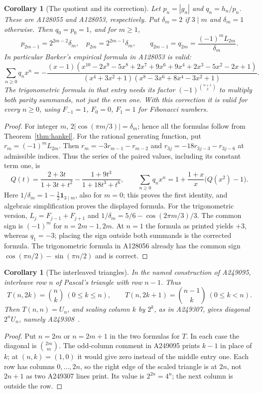 \documentclass[11pt]{article}
\newtheorem{corollary}[theorem]{Corollary}
\begin{document}
\begin{corollary}[The quotient and its correction]\label{cor:quotient}
Let $p_n=|g_n|$ and $q_n=h_n/p_n$. These are A128055 and A128053,
respectively. Put $\delta_m=2$ if $3\mid m$ and $\delta_m=1$ otherwise.
Then $q_0=p_0=1$, and for $m\geq1$,
\[
 p_{2m-1}=2^{2m-2}\delta_m,\quad p_{2m}=2^{2m-1}\delta_m,
 \qquad q_{2m-1}=q_{2m}=\frac{(-1)^mL_{2m}}{\delta_m}.
\]
In particular Barker's empirical formula in A128053 is valid:
\[
 \sum_{n\geq0}q_nx^n=
 -\frac{(x-1)(x^{10}-2x^9-5x^8+2x^7+9x^6+9x^4+2x^3-5x^2-2x+1)}
 {(x^4+3x^2+1)(x^8-3x^6+8x^4-3x^2+1)}.
\]
The trigonometric formula in that entry needs its factor
$(-1)^{\binom{n+1}2}$ to multiply both parity summands, not just the
even one. With this correction it is valid for every $n\geq0$,
using $F_{-1}=1$, $F_0=0$, $F_1=1$ for Fibonacci numbers.
\end{corollary}
\begin{proof}
For integer $m$, $2|\cos(\pi m/3)|=\delta_m$; hence all the formulas
follow from Theorem~\ref{thm:hankel}.
For the rational generating function, put $r_m=(-1)^mL_{2m}$.
Then $r_m=-3r_{m-1}-r_{m-2}$ and
$r_{3j}=-18r_{3j-3}-r_{3j-6}$ at admissible indices.
Thus the series of the paired values, including its constant term one, is
\[
 Q(t)=\frac{2+3t}{1+3t+t^2}-\frac{1+9t^3}{1+18t^3+t^6},
 \qquad
 \sum_{n\geq0}q_nx^n=1+\frac{1+x}{x}\bigl(Q(x^2)-1\bigr).
\]
Here $1/\delta_m=1-\tfrac12\boldsymbol1_{3\mid m}$, also for $m=0$;
this proves the first identity, and algebraic simplification proves the
displayed formula. For the trigonometric version,
$L_j=F_{j-1}+F_{j+1}$ and
$1/\delta_m=5/6-\cos(2\pi m/3)/3$.
The common sign is $(-1)^m$ for $n=2m-1,2m$.
At $n=1$ the formula as printed yields $+3$, whereas $q_1=-3$;
placing the sign outside both summands is the corrected formula.
The trigonometric formula in A128056 already has the common sign
$\cos(\pi n/2)-\sin(\pi n/2)$ and is correct.
\end{proof}

\begin{corollary}[The interleaved triangles]
In the named construction of A249095, interleave row $n$ of Pascal's
triangle with row $n-1$. Thus
\[
 T(n,2k)=\binom nk\ (0\leq k\leq n),\qquad
 T(n,2k+1)=\binom{n-1}k\ (0\leq k<n).
\]
Then $T(n,n)=U_n$, and scaling column $k$ by $2^k$, as in A249307,
gives diagonal $2^nU_n$, namely A249308~\cite{interleaved}.
\end{corollary}
\begin{proof}
Put $n=2m$ or $n=2m+1$ in the two formulas for $T$.
In each case the diagonal is $\binom{2m}m$.
The odd-column comment in A249095 prints $k-1$ in place of $k$;
at $(n,k)=(1,0)$ it would give zero instead of the middle entry one.
Each row has columns $0,\ldots,2n$, so the right edge of the scaled
triangle is at $2n$, not $2n+1$ as two A249307 lines print.
Its value is $2^{2n}=4^n$; the next column is outside the row.
\end{proof}
\end{document}

